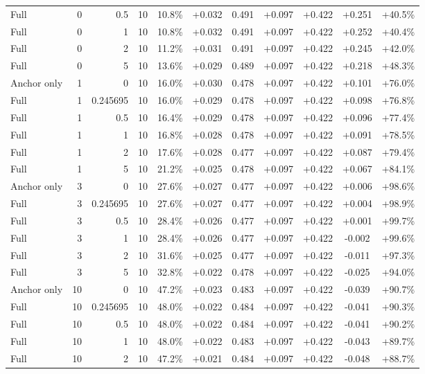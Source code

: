\begin{table}[htbp]
\begin{tabular}{lrrrccccccc}
Full & 0 & 0.5 & 10 & 10.8\% & +0.032 & 0.491 & +0.097 & +0.422 & +0.251 & +40.5\% \\
Full & 0 & 1 & 10 & 10.8\% & +0.032 & 0.491 & +0.097 & +0.422 & +0.252 & +40.4\% \\
Full & 0 & 2 & 10 & 11.2\% & +0.031 & 0.491 & +0.097 & +0.422 & +0.245 & +42.0\% \\
Full & 0 & 5 & 10 & 13.6\% & +0.029 & 0.489 & +0.097 & +0.422 & +0.218 & +48.3\% \\
Anchor only & 1 & 0 & 10 & 16.0\% & +0.030 & 0.478 & +0.097 & +0.422 & +0.101 & +76.0\% \\
Full & 1 & 0.245695 & 10 & 16.0\% & +0.029 & 0.478 & +0.097 & +0.422 & +0.098 & +76.8\% \\
Full & 1 & 0.5 & 10 & 16.4\% & +0.029 & 0.478 & +0.097 & +0.422 & +0.096 & +77.4\% \\
Full & 1 & 1 & 10 & 16.8\% & +0.028 & 0.478 & +0.097 & +0.422 & +0.091 & +78.5\% \\
Full & 1 & 2 & 10 & 17.6\% & +0.028 & 0.477 & +0.097 & +0.422 & +0.087 & +79.4\% \\
Full & 1 & 5 & 10 & 21.2\% & +0.025 & 0.478 & +0.097 & +0.422 & +0.067 & +84.1\% \\
Anchor only & 3 & 0 & 10 & 27.6\% & +0.027 & 0.477 & +0.097 & +0.422 & +0.006 & +98.6\% \\
Full & 3 & 0.245695 & 10 & 27.6\% & +0.027 & 0.477 & +0.097 & +0.422 & +0.004 & +98.9\% \\
Full & 3 & 0.5 & 10 & 28.4\% & +0.026 & 0.477 & +0.097 & +0.422 & +0.001 & +99.7\% \\
Full & 3 & 1 & 10 & 28.4\% & +0.026 & 0.477 & +0.097 & +0.422 & -0.002 & +99.6\% \\
Full & 3 & 2 & 10 & 31.6\% & +0.025 & 0.477 & +0.097 & +0.422 & -0.011 & +97.3\% \\
Full & 3 & 5 & 10 & 32.8\% & +0.022 & 0.478 & +0.097 & +0.422 & -0.025 & +94.0\% \\
Anchor only & 10 & 0 & 10 & 47.2\% & +0.023 & 0.483 & +0.097 & +0.422 & -0.039 & +90.7\% \\
Full & 10 & 0.245695 & 10 & 48.0\% & +0.022 & 0.484 & +0.097 & +0.422 & -0.041 & +90.3\% \\
Full & 10 & 0.5 & 10 & 48.0\% & +0.022 & 0.484 & +0.097 & +0.422 & -0.041 & +90.2\% \\
Full & 10 & 1 & 10 & 48.0\% & +0.022 & 0.483 & +0.097 & +0.422 & -0.043 & +89.7\% \\
Full & 10 & 2 & 10 & 47.2\% & +0.021 & 0.484 & +0.097 & +0.422 & -0.048 & +88.7\% \\

\end{tabular}
\end{table}
